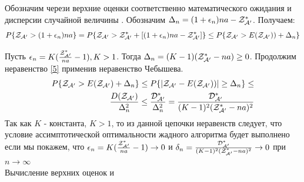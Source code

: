 \documentclass[a4paper, 14pt]{extarticle}
\numberwithin{equation}{section}
\begin{document}
Обозначим через\topboundE и \topboundD верхние оценки соответственно математического ожидания \randomvalueE и дисперсии \randomvalueD случайной величины \randomvalue . Обозначим $\Delta_n=(1+\epsilon_n)na-\text{$\mathcal{Z^*_{A'}}$}$. Получаем:
\begin{equation}\label{5}
P\{\text{$\mathcal{Z_{A'}}$} > (1+\epsilon_n)na\} = 
P\{\text{$\mathcal{Z_{A'}}$} > \text{$\mathcal{Z^*_{A'}}$}+[(1+\epsilon_n)na-\text{$\mathcal{Z^*_{A'}}$}]\} \leq
P\{\text{$\mathcal{Z_{A'}}$} > \text{$E(\text{$\mathcal{Z_{A'}}$})$})+ \Delta_n\}
\end{equation}

Пусть $\epsilon_n = K(\frac{\text{$\mathcal{Z^*_{A'}}$}}{na}-1), K>1$.
Тогда $ \Delta_n = (K-1)(\text{$\mathcal{Z^*_{A'}}$}-na) \geq 0$.
Продолжим неравенство \eqref{5} применив неравенство Чебышева.
\begin{equation}\label{6}
\begin{aligned}
P\{\text{$\mathcal{Z_{A'}}$}> E(\text{$\mathcal{Z_{A'}}$})+ \Delta_n\} \leq 
P\{|\text{$\mathcal{Z_{A'}}$}- \text{$E(\text{$\mathcal{Z_{A'}}$})$})| \geq \Delta_n\} \leq \\
\frac{\text{$D(\text{$\mathcal{Z_{A'}}$})$}}{\Delta^2_n} \leq
\frac{\text{$\mathcal{D^*_{A'}}$}}{\Delta^2_n} = 
\frac{\text{$\mathcal{D^*_{A'}}$}}{(K-1)^2(\text{$\mathcal{Z^*_{A'}}$}-na)^2}
\end{aligned}
\end{equation}
Так как $K$ - константа, $K>1$, то из данной цепочки неравенств следует, что условие ассимптотической оптимальности жадного алгоритма будет выполнено если мы покажем, что
$ \epsilon_n=K(\frac{\text{$\mathcal{Z^*_{A'}}$}}{na}-1) \rightarrow 0$ и 
$ \delta_n = \frac{\text{$\mathcal{D^*_{A'}}$}}{(K-1)^2(\text{$\mathcal{Z^*_{A'}}$}-na)^2} \rightarrow 0$ при $ n \rightarrow \infty$\\

Вычисление верхних оценок \topboundE и \topboundD\\

\newcommand{\chanceLklesserX}{$\Phi_k(x)$}
\newcommand{\randomNormalValueE}{$l_k$}
\end{document}
